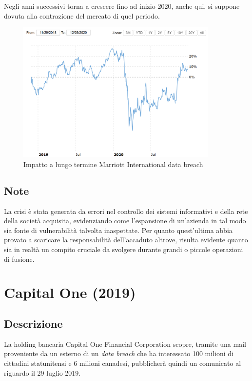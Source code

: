 \documentclass[12pt,a4paper,openright,twoside]{report}
\begin{document}
Negli anni successivi torna a crescere fino ad inizio 2020, anche qui, si suppone dovuta alla contrazione del mercato di quel periodo.\\

\begin{figure}[H] 
\begin{center} 
\includegraphics[width=10cm]{figures/marriott_long.png} 
\caption[Grafico Marriott long]{Impatto a lungo termine  Marriott International data breach}\label{fig:mrt2}
\end{center}
\end{figure}

\subsection{Note}
La crisi \`e stata generata da errori nel controllo dei sistemi informativi e della rete della societ\`a acquisita, evidenziando come l'espansione di un'azienda in tal modo sia fonte di vulnerabilit\`a talvolta inaspettate. Per quanto quest'ultima abbia provato a scaricare la responsabilit\`a dell'accaduto altrove, risulta evidente quanto sia in realt\`a un compito cruciale da svolgere durante grandi o piccole operazioni di fusione.\\ 
\section{Capital One (2019)}
\subsection{Descrizione}
La holding bancaria Capital One Financial Corporation scopre, tramite una mail proveniente da un esterno di un \textit{data breach} che ha interessato 100 milioni di cittadini statunitensi e 6 milioni canadesi, pubblicher\`a quindi un comunicato al riguardo il 29 luglio 2019\cite{CapitalOne_case_study}.
\end{document}
